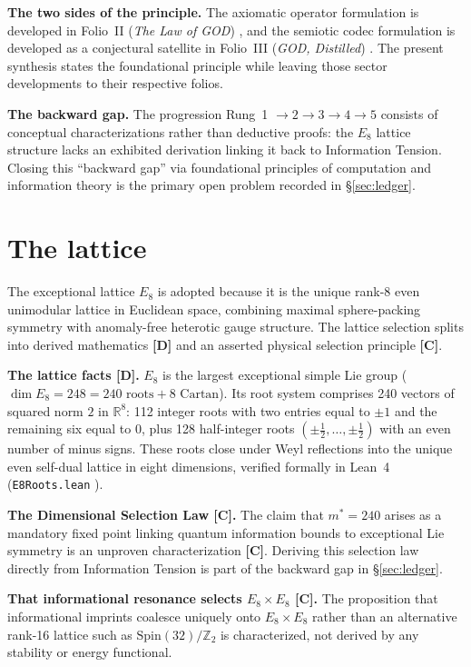 \documentclass[11pt]{article}
\begin{document}
\noindent\textbf{The two sides of the principle.} The axiomatic operator formulation is developed in Folio~II (\emph{The Law of GOD}) \cite{folio-ii}, and the semiotic codec formulation is developed as a conjectural satellite in Folio~III (\emph{GOD, Distilled}) \cite{folio-iii}. The present synthesis states the foundational principle while leaving those sector developments to their respective folios.

\noindent\textbf{The backward gap.} The progression Rung~1 $\to 2 \to 3 \to 4 \to 5$ consists of conceptual characterizations rather than deductive proofs: the $E_8$ lattice structure lacks an exhibited derivation linking it back to Information Tension. Closing this ``backward gap'' via foundational principles of computation and information theory is the primary open problem recorded in \S\ref{sec:ledger}.

\section{The lattice}
\label{sec:lattice}
The exceptional lattice $E_8$ is adopted because it is the unique rank-8 even unimodular lattice in Euclidean space, combining maximal sphere-packing symmetry with anomaly-free heterotic gauge structure. The lattice selection splits into derived mathematics \textbf{[D]} and an asserted physical selection principle \textbf{[C]}.

\noindent\textbf{The lattice facts [D].} $E_8$ is the largest exceptional simple Lie group ($\dim E_8 = 248 = 240\text{ roots} + 8\text{ Cartan}$). Its root system comprises 240 vectors of squared norm $2$ in $\mathbb{R}^8$: 112 integer roots with two entries equal to $\pm 1$ and the remaining six equal to $0$, plus 128 half-integer roots $(\pm \tfrac{1}{2}, \dots, \pm \tfrac{1}{2})$ with an even number of minus signs. These roots close under Weyl reflections into the unique even self-dual lattice in eight dimensions, verified formally in Lean~4 (\texttt{E8Roots.lean} \cite{res-nova-repo}).

\noindent\textbf{The Dimensional Selection Law [C].} The claim that $m^* = 240$ arises as a mandatory fixed point linking quantum information bounds to exceptional Lie symmetry is an unproven characterization \textbf{[C]}. Deriving this selection law directly from Information Tension is part of the backward gap in \S\ref{sec:ledger}.

\noindent\textbf{That informational resonance selects $E_8 \times E_8$ [C].} The proposition that informational imprints coalesce uniquely onto $E_8 \times E_8$ rather than an alternative rank-16 lattice such as $\mathrm{Spin}(32)/\mathbb{Z}_2$ is characterized, not derived by any stability or energy functional.
\end{document}
